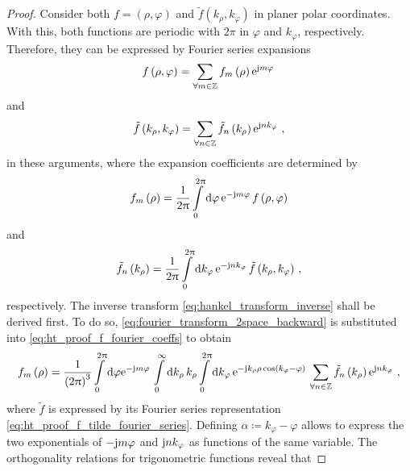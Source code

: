 \begin{proof}
	Consider both $f = \left(\rho, \varphi\right)$ and
	$\tilde{f} \left(k_\rho, k_\varphi\right)$ in planer polar coordinates.
	With this, both functions are periodic with $2\pi$ in $\varphi$ and
	$k_\varphi$, respectively.
	Therefore, they can be expressed by Fourier series expansions
	\begin{equation}\label{eq:ht_proof_f_fourier_series}
		f \left(\rho,\varphi\right) =
		\sum_{\forall m \in \mathbb{Z}}
		f_m \left(\rho\right)
		\mathrm{e}^{\mathrm{j} m \varphi}\,
	\end{equation}
	and
	\begin{equation}\label{eq:ht_proof_f_tilde_fourier_series}
		\tilde{f} \left(k_\rho, k_\varphi\right) = 
		\sum_{\forall n \in \mathbb{Z}}
		\tilde{f}_n \left(k_\rho\right)
		\mathrm{e}^{\mathrm{j} n k_\varphi}\,
		\, ,
	\end{equation}
	in these arguments, where the expansion coefficients are determined by
	\begin{equation}\label{eq:ht_proof_f_fourier_coeffs}
		f_m\left(\rho\right) = \frac{1}{2\uppi}
		\int\limits_{0}^{2\uppi} \mathrm{d} \varphi \,
		\mathrm{e}^{-\mathrm{j} m \varphi}\,
		f \left(\rho, \varphi\right)
	\end{equation}
	and
	\begin{equation}\label{eq:ht_proof_f_tilde_fourier_coeffs}
		\tilde{f}_n \left(k_\rho\right) = \frac{1}{2\uppi}
		\int\limits_{0}^{2\uppi} \mathrm{d} k_\varphi \,
		\mathrm{e}^{-\mathrm{j} n k_\varphi}\,
		\tilde{f} \left(k_\rho, k_\varphi\right)
		\, ,
	\end{equation}
	respectively.
	The inverse transform \eqref{eq:hankel_transform_inverse} shall be derived
	first.
	To do so, \eqref{eq:fourier_transform_2space_backward} is substituted into
	\eqref{eq:ht_proof_f_fourier_coeffs} to obtain
	\begin{equation}\label{eq:ht_proof_triple_integral}
		f_m \left(\rho\right)  =
		\frac{1}{\left(2\uppi\right)^3}
		\int\limits_{0}^{2\uppi} \mathrm{d} \varphi
		\mathrm{e}^{-\mathrm{j} m \varphi}\,
		\int\limits_{0}^{\infty} \mathrm{d} k_\rho \, k_\rho
		\int\limits_{0}^{2\uppi} \mathrm{d} k_\varphi \, 
		\mathrm{e}^{-\mathrm{j} k_\rho \rho \cos \left(k_\varphi - \varphi\right)}\,
		\sum_{\forall n \in \mathbb{Z}}
		\tilde{f}_n \left(k_\rho\right) \mathrm{e}^{\mathrm{j} n k_\varphi}\,
		\, ,
	\end{equation}
	where $\tilde{f}$ is expressed by its Fourier series representation
	\eqref{eq:ht_proof_f_tilde_fourier_series}.
	Defining $\alpha \coloneqq k_\varphi - \varphi$ allows to express the
	two exponentials of $-\mathrm{j} m \varphi$ and $\mathrm{j} n k_\varphi$ as functions
	of the same variable.
	The orthogonality relations for trigonometric functions reveal that

\end{proof}
